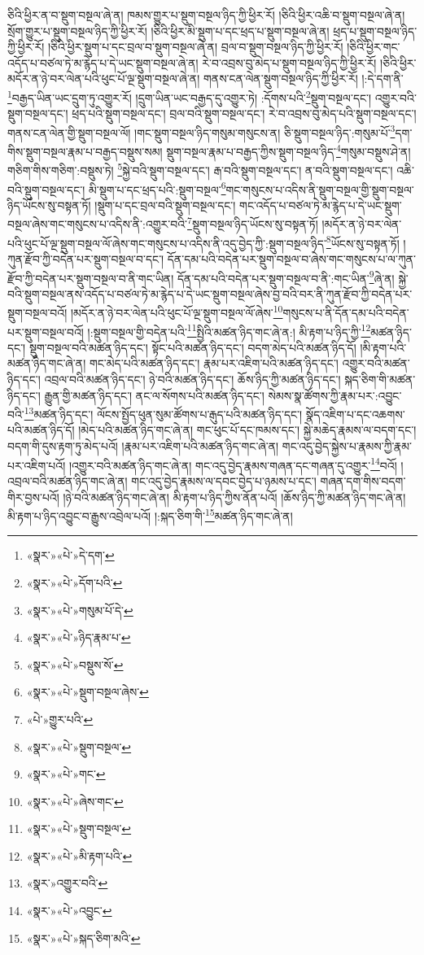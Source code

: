 ཅིའི་ཕྱིར་ན་བ་སྡུག་བསྔལ་ཞེ་ན། ཁམས་གྱུར་པ་སྡུག་བསྔལ་ཉིད་ཀྱི་ཕྱིར་རོ། །ཅིའི་ཕྱིར་འཆི་བ་སྡུག་བསྔལ་ཞེ་ན། སྲོག་གྱུར་པ་སྡུག་བསྔལ་ཉིད་ཀྱི་ཕྱིར་རོ། །ཅིའི་ཕྱིར་མི་སྡུག་པ་དང་ཕྲད་པ་སྡུག་བསྔལ་ཞེ་ན། ཕྲད་པ་སྡུག་བསྔལ་ཉིད་ཀྱི་ཕྱིར་རོ། །ཅིའི་ཕྱིར་སྡུག་པ་དང་བྲལ་བ་སྡུག་བསྔལ་ཞེ་ན། བྲལ་བ་སྡུག་བསྔལ་ཉིད་ཀྱི་ཕྱིར་རོ། །ཅིའི་ཕྱིར་གང་འདོད་པ་བཙལ་ཏེ་མ་རྙེད་པ་དེ་ཡང་སྡུག་བསྔལ་ཞེ་ན། རེ་བ་འབྲས་བུ་མེད་པ་སྡུག་བསྔལ་ཉིད་ཀྱི་ཕྱིར་རོ། །ཅིའི་ཕྱིར་མདོར་ན་ཉེ་བར་ལེན་པའི་ཕུང་པོ་ལྔ་སྡུག་བསྔལ་ཞེ་ན། གནས་ངན་ལེན་སྡུག་བསྔལ་ཉིད་ཀྱི་ཕྱིར་རོ། །:དེ་དག་ནི་\footnote{«སྣར་»«པེ་»དེ་དག་}བརྒྱད་ཡིན་ཡང་དྲུག་ཏུ་འགྱུར་རོ། །དྲུག་ཡིན་ཡང་བརྒྱད་དུ་འགྱུར་ཏེ། :དོགས་པའི་\footnote{«སྣར་»«པེ་»དོག་པའི་}སྡུག་བསྔལ་དང་། འགྱུར་བའི་སྡུག་བསྔལ་དང་། ཕྲད་པའི་སྡུག་བསྔལ་དང་། བྲལ་བའི་སྡུག་བསྔལ་དང་། རེ་བ་འབྲས་བུ་མེད་པའི་སྡུག་བསྔལ་དང་། གནས་ངན་ལེན་གྱི་སྡུག་བསྔལ་ལོ། །གང་སྡུག་བསྔལ་ཉིད་གསུམ་གསུངས་ན། ཅི་སྡུག་བསྔལ་ཉིད་:གསུམ་པོ་\footnote{«སྣར་»«པེ་»གསུམ་པོ་དེ་}དག་གིས་སྡུག་བསྔལ་རྣམ་པ་བརྒྱད་བསྡུས་སམ། སྡུག་བསྔལ་རྣམ་པ་བརྒྱད་ཀྱིས་སྡུག་བསྔལ་ཉིད་\footnote{«སྣར་»«པེ་»ཉིད་རྣམ་པ་}གསུམ་བསྡུས་ཤེ་ན། གཅིག་གིས་གཅིག་:བསྡུས་ཏེ། \footnote{«སྣར་»«པེ་»བསྡུས་སོ་}སྐྱེ་བའི་སྡུག་བསྔལ་དང་། རྒ་བའི་སྡུག་བསྔལ་དང་། ན་བའི་སྡུག་བསྔལ་དང་། འཆི་བའི་སྡུག་བསྔལ་དང་། མི་སྡུག་པ་དང་ཕྲད་པའི་:སྡུག་བསྔལ་\footnote{«སྣར་»«པེ་»སྡུག་བསྔལ་ཞེས་}གང་གསུངས་པ་འདིས་ནི་སྡུག་བསྔལ་གྱི་སྡུག་བསྔལ་ཉིད་ཡོངས་སུ་བསྟན་ཏོ། །སྡུག་པ་དང་བྲལ་བའི་སྡུག་བསྔལ་དང་། གང་འདོད་པ་བཙལ་ཏེ་མ་རྙེད་པ་དེ་ཡང་སྡུག་བསྔལ་ཞེས་གང་གསུངས་པ་འདིས་ནི་:འགྱུར་བའི་\footnote{«པེ་»གྱུར་པའི་}སྡུག་བསྔལ་ཉིད་ཡོངས་སུ་བསྟན་ཏོ། །མདོར་ན་ཉེ་བར་ལེན་པའི་ཕུང་པོ་ལྔ་སྡུག་བསྔལ་ལོ་ཞེས་གང་གསུངས་པ་འདིས་ནི་འདུ་བྱེད་ཀྱི་:སྡུག་བསྔལ་ཉིད་\footnote{«སྣར་»«པེ་»སྡུག་བསྔལ་}ཡོངས་སུ་བསྟན་ཏོ། །ཀུན་རྫོབ་ཀྱི་བདེན་པར་སྡུག་བསྔལ་བ་དང་། དོན་དམ་པའི་བདེན་པར་སྡུག་བསྔལ་བ་ཞེས་གང་གསུངས་པ་ལ་ཀུན་རྫོབ་ཀྱི་བདེན་པར་སྡུག་བསྔལ་བ་ནི་གང་ཡིན། དོན་དམ་པའི་བདེན་པར་སྡུག་བསྔལ་བ་ནི་:གང་ཡིན་\footnote{«སྣར་»«པེ་»གང་}ཞེ་ན། སྐྱེ་བའི་སྡུག་བསྔལ་ནས་འདོད་པ་བཙལ་ཏེ་མ་རྙེད་པ་དེ་ཡང་སྡུག་བསྔལ་ཞེས་བྱ་བའི་བར་ནི་ཀུན་རྫོབ་ཀྱི་བདེན་པར་སྡུག་བསྔལ་བའོ། །མདོར་ན་ཉེ་བར་ལེན་པའི་ཕུང་པོ་ལྔ་སྡུག་བསྔལ་ལོ་ཞེས་\footnote{«སྣར་»«པེ་»ཞེས་གང་}གསུངས་པ་ནི་དོན་དམ་པའི་བདེན་པར་སྡུག་བསྔལ་བའོ། །:སྡུག་བསྔལ་གྱི་བདེན་པའི་\footnote{«སྣར་»«པེ་»སྡུག་བསྔལ་}སྤྱིའི་མཚན་ཉིད་གང་ཞེ་ན:། མི་རྟག་པ་ཉིད་ཀྱི་\footnote{«སྣར་»«པེ་»མི་རྟག་པའི་}མཚན་ཉིད་དང་། སྡུག་བསྔལ་བའི་མཚན་ཉིད་དང་། སྟོང་པའི་མཚན་ཉིད་དང་། བདག་མེད་པའི་མཚན་ཉིད་དོ། །མི་རྟག་པའི་མཚན་ཉིད་གང་ཞེ་ན། གང་མེད་པའི་མཚན་ཉིད་དང་། རྣམ་པར་འཇིག་པའི་མཚན་ཉིད་དང་། འགྱུར་བའི་མཚན་ཉིད་དང་། འབྲལ་བའི་མཚན་ཉིད་དང་། ཉེ་བའི་མཚན་ཉིད་དང་། ཆོས་ཉིད་ཀྱི་མཚན་ཉིད་དང་། སྐད་ཅིག་གི་མཚན་ཉིད་དང་། རྒྱུན་གྱི་མཚན་ཉིད་དང་། ནང་ལ་སོགས་པའི་མཚན་ཉིད་དང་། སེམས་སྣ་ཚོགས་ཀྱི་རྣམ་པར་:འབྱུང་བའི་\footnote{«སྣར་»འགྱུར་བའི་}མཚན་ཉིད་དང་། ལོངས་སྤྱོད་ཕུན་སུམ་ཚོགས་པ་རྒུད་པའི་མཚན་ཉིད་དང་། སྣོད་འཇིག་པ་དང་འཆགས་པའི་མཚན་ཉིད་དོ། །མེད་པའི་མཚན་ཉིད་གང་ཞེ་ན། གང་ཕུང་པོ་དང་ཁམས་དང་། སྐྱེ་མཆེད་རྣམས་ལ་བདག་དང་། བདག་གི་དུས་རྟག་ཏུ་མེད་པའོ། །རྣམ་པར་འཇིག་པའི་མཚན་ཉིད་གང་ཞེ་ན། གང་འདུ་བྱེད་སྐྱེས་པ་རྣམས་ཀྱི་རྣམ་པར་འཇིག་པའོ། །འགྱུར་བའི་མཚན་ཉིད་གང་ཞེ་ན། གང་འདུ་བྱེད་རྣམས་གཞན་དང་གཞན་དུ་འགྱུར་\footnote{«སྣར་»«པེ་»འབྱུང་}བའོ། །འབྲལ་བའི་མཚན་ཉིད་གང་ཞེ་ན། གང་འདུ་བྱེད་རྣམས་ལ་དབང་བྱེད་པ་ཉམས་པ་དང་། གཞན་དག་གིས་བདག་གིར་བྱས་པའོ། །ཉེ་བའི་མཚན་ཉིད་གང་ཞེ་ན། མི་རྟག་པ་ཉིད་ཀྱིས་ནོན་པའོ། །ཆོས་ཉིད་ཀྱི་མཚན་ཉིད་གང་ཞེ་ན། མི་རྟག་པ་ཉིད་འབྱུང་བ་རྒྱུས་འབྲེལ་པའོ། །:སྐད་ཅིག་གི་\footnote{«སྣར་»«པེ་»སྐད་ཅིག་མའི་}མཚན་ཉིད་གང་ཞེ་ན། 